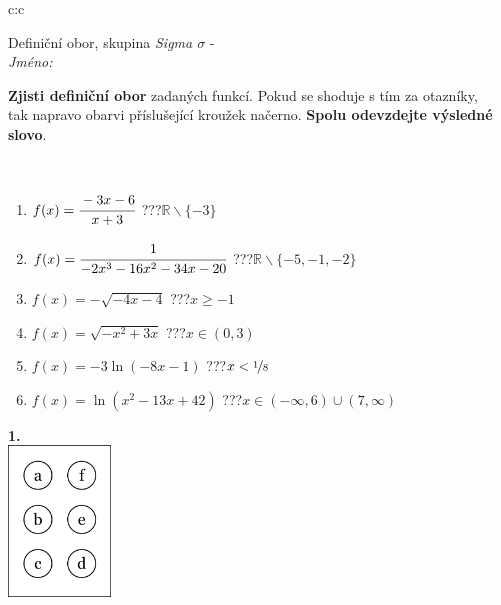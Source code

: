 \documentclass[10pt]{report}
\begin{document}
\begin{tabular}{c:c}
\begin{minipage}[c][104.5mm][t]{0.5\linewidth}
\begin{center}
\vspace{7mm}
{\huge Definiční obor, skupina \textit{Sigma $\sigma$} -}\\[5mm]
\textit{Jméno:}\phantom{xxxxxxxxxxxxxxxxxxxxxxxxxxxxxxxxxxxxxxxxxxxxxxxxxxxxxxxxxxxxxxxxx}\\[5mm]
\begin{minipage}{0.95\linewidth}
\begin{center}
\textbf{Zjisti definiční obor} zadaných funkcí. Pokud se shoduje s tím za otazníky,\\tak napravo obarvi příslušející kroužek načerno. \textbf{Spolu odevzdejte výsledné slovo}.
\end{center}
\end{minipage}
\\[1mm]
\begin{minipage}{0.79\linewidth}
\begin{center}
\begin{varwidth}{\linewidth}
\begin{enumerate}
\normalsizerrr
\item $f(x)=\cfrac{-3x-6}{x+3}$\quad \dotfill\; ???\;\dotfill \quad $\mathbb{R}\smallsetminus\{-3\}$
\item $f(x)=\cfrac{1}{-2x^3-16x^2-34x-20}$\quad \dotfill\; ???\;\dotfill \quad $\mathbb{R}\smallsetminus\{-5,-1,-2\}$
\item $f(x)=-\sqrt{-4x-4}$\quad \dotfill\; ???\;\dotfill \quad $x\geq-1$
\item $f(x)=\sqrt{-x^2+3x}$\quad \dotfill\; ???\;\dotfill \quad $x\in(0 , 3)$
\item $f(x)=-3\ln{(-8x-1)}$\quad \dotfill\; ???\;\dotfill \quad $x<\nicefrac{1}{8}$
\item $f(x)=\ln{(x^2-13x+42)}$\quad \dotfill\; ???\;\dotfill \quad $x\in(-\infty , 6)\cup(7 , \infty)$
\end{enumerate}
\end{varwidth}
\end{center}
\end{minipage}
\begin{minipage}{0.20\linewidth}
\begin{center}
{\Huge\bfseries 1.} \\[2mm]
\includegraphics[height=40mm]{../images/braille.png}

\end{center}
\end{minipage}
\end{center}
\end{minipage}
\end{tabular}
\end{document}
